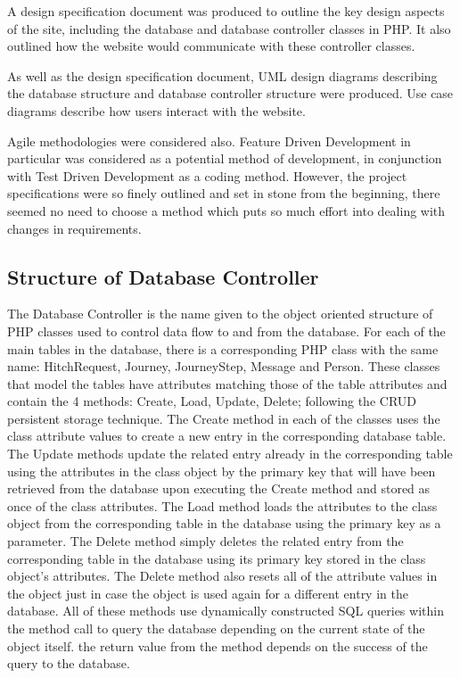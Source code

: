 		A design specification document was produced to outline the key design aspects of the site, including the database and database controller classes in PHP. It also outlined how the website would communicate with these controller classes.
		
		As well as the design specification document, UML design diagrams describing the database structure and database controller structure were produced. Use case diagrams describe how users interact with the website.
		
		Agile methodologies were considered also. Feature Driven Development in particular was considered as a potential method of development, in conjunction with Test Driven Development as a coding method. However, the project specifications were so finely outlined and set in stone from the beginning, there seemed no need to choose a method which puts so much effort into dealing with changes in requirements.
		
	\subsection{Structure of Database Controller}
		The Database Controller is the name given to the object oriented structure of PHP classes used to control data flow to and from the database. For each of the main tables in the database, there is a corresponding PHP class with the same name: Hitch\textunderscore Request, Journey, Journey\textunderscore Step, Message and Person. These classes that model the tables have attributes matching those of the table attributes and contain the 4 methods: Create, Load, Update, Delete; following the CRUD persistent storage technique\cite{crud_technique}. The Create method in each of the classes uses the class attribute values to create a new entry in the corresponding database table. The Update methods update the related entry already in the corresponding table using the attributes in the class object by the primary key that will have been retrieved from the database upon executing the Create method and stored as once of the class attributes. The Load method loads the attributes to the class object from the corresponding table in the database using the primary key as a parameter. The Delete method simply deletes the related entry from the corresponding table in the database using its primary key stored in the class object's attributes. The Delete method also resets all of the attribute values in the object just in case the object is used again for a different entry in the database. All of these methods use dynamically constructed SQL queries within the method call to query the database depending on the current state of the object itself. the return value from the method depends on the success of the query to the database.
		
